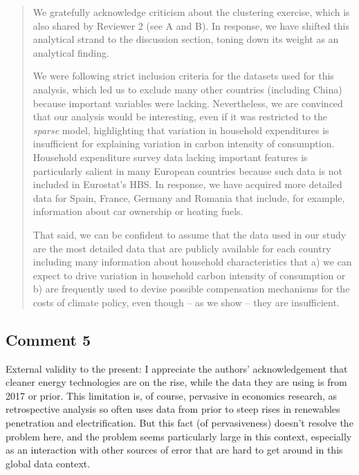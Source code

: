 \documentclass[11pt]{article}
\newenvironment{response}
{\begin{quote}\color{black}}
{\end{quote}}
\begin{document}
\begin{response}
    We gratefully acknowledge criticism about the clustering exercise, which is also shared by Reviewer 2 (see A and B). In response, we have shifted this analytical strand to the discussion section, toning down its weight as an analytical finding.

    We were following strict inclusion criteria for the datasets used for this analysis, which led us to exclude many other countries (including China) because important variables were lacking. Nevertheless, we are convinced that our analysis would be interesting, even if it was restricted to the \textit{sparse} model, highlighting that variation in household expenditures is insufficient for explaining variation in carbon intensity of consumption. Household expenditure survey data lacking important features is particularly salient in many European countries because such data is not included in Eurostat's HBS. In response, we have acquired more detailed data for Spain, France, Germany and Romania that include, for example, information about car ownership or heating fuels.

    That said, we can be confident to assume that the data used in our study are the most detailed data that are publicly available for each country including many information about household characteristics that a) we can expect to drive variation in household carbon intensity of consumption or b) are frequently used to devise possible compensation mechanisms for the costs of climate policy, even though -- as we show -- they are insufficient.
    
\end{response}

\subsection*{Comment 5}\label{comment_R1_5}

\begin{commentbox}
    External validity to the present: I appreciate the authors' acknowledgement that cleaner energy technologies are on the rise, while the data they are using is from 2017 or prior. This limitation is, of course, pervasive in economics research, as retrospective analysis so often uses data from prior to steep rises in renewables penetration and electrification. But this fact (of pervasiveness) doesn't resolve the problem here, and the problem seems particularly large in this context, especially as an interaction with other sources of error that are hard to get around in this global data context.
\end{commentbox}
\end{document}
